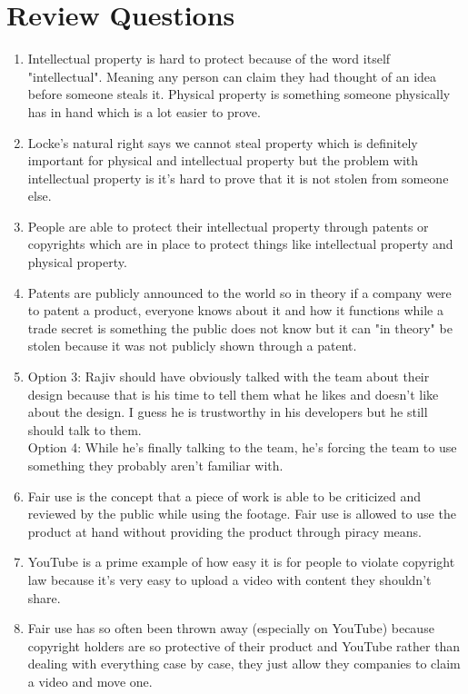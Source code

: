\documentclass[12pt]{article}
\begin{document}
\section{Review Questions}
    \begin{enumerate}
        \item Intellectual property is hard to protect because of the word itself "intellectual". Meaning any person can claim they had thought of an idea before someone steals it. Physical property is something someone physically has in hand which is a lot easier to prove.
        \item Locke's natural right says we cannot steal property which is definitely important for physical and intellectual property but the problem with intellectual property is it's hard to prove that it is not stolen from someone else.
        \item People are able to protect their intellectual property through patents or copyrights which are in place to protect things like intellectual property and physical property.
        \item Patents are publicly announced to the world so in theory if a company were to patent a product, everyone knows about it and how it functions while a trade secret is something the public does not know but it can "in theory" be stolen because it was not publicly shown through a patent.
        \item Option 3: Rajiv should have obviously talked with the team about their design because that is his time to tell them what he likes and doesn't like about the design. I guess he is trustworthy in his developers but he still should talk to them.\\Option 4: While he's finally talking to the team, he's forcing the team to use something they probably aren't familiar with.
        \item Fair use is the concept that a piece of work is able to be criticized and reviewed by the public while using the footage. Fair use is allowed to use the product at hand without providing the product through piracy means.
        \item YouTube is a prime example of how easy it is for people to violate copyright law because it's very easy to upload a video with content they shouldn't share.
        \item Fair use has so often been thrown away (especially on YouTube) because copyright holders are so protective of their product and YouTube rather than dealing with everything case by case, they just allow they companies to claim a video and move one.

\end{enumerate}
\end{document}
